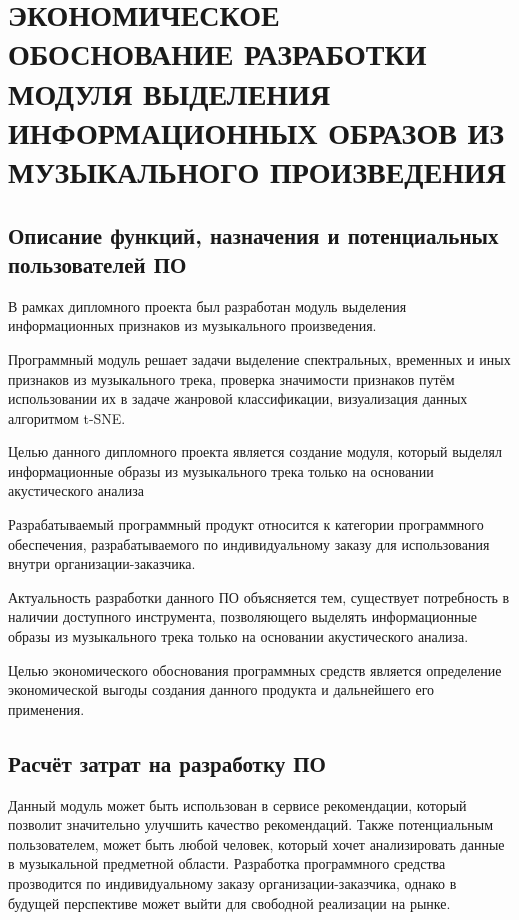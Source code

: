 \newcommand{\byr}{ руб.}

\section{ЭКОНОМИЧЕСКОЕ ОБОСНОВАНИЕ РАЗРАБОТКИ  МОДУЛЯ ВЫДЕЛЕНИЯ ИНФОРМАЦИОННЫХ ОБРАЗОВ ИЗ МУЗЫКАЛЬНОГО ПРОИЗВЕДЕНИЯ}
\label{sec:econ}

\subsection{Описание функций, назначения и потенциальных пользователей ПО}
\label{sub:econ:overview_appointment}
В рамках дипломного проекта был разработан модуль выделения информационных признаков из музыкального произведения.

Программный модуль решает задачи выделение спектральных, временных и иных признаков из музыкального трека, проверка значимости признаков путём использовании их в задаче жанровой классификации, визуализация данных алгоритмом t-SNE.

Целью данного дипломного проекта является создание  модуля, который выделял информационные образы из музыкального трека только на основании  акустического анализа

Разрабатываемый программный продукт относится к категории программного обеспечения, разрабатываемого по индивидуальному заказу для использования внутри организации-заказчика.

Актуальность разработки данного ПО объясняется тем, существует потребность в наличии доступного инструмента, позволяющего выделять информационные образы из музыкального трека только на основании  акустического анализа.

Целью экономического обоснования программных средств является определение экономической выгоды создания данного продукта и дальнейшего его применения.

\subsection{Расчёт затрат на разработку ПО}
\label{sub:econ:expenses}


Данный модуль может быть использован в сервисе рекомендации, который позволит значительно улучшить качество рекомендаций. Также потенциальным пользователем, может быть любой человек, который хочет анализировать данные в музыкальной предметной области. Разработка программного средства прозводится по индивидуальному заказу организации-заказчика, однако в будущей перспективе может выйти для свободной реализации на рынке.

